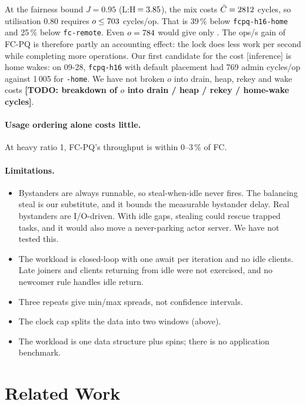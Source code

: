 \documentclass[10pt,twocolumn]{article}
\newcommand{\lk}[1]{\texttt{#1}}
\newcommand{\todo}[1]{{\color{red}\textbf{[TODO: #1]}}}
\begin{document}
At the fairness bound $J{=}0.95$ (L:H\,$=3.85$), the mix costs
$\bar C=2812$ cycles, so utilisation 0.80 requires
$o\le703$ cycles/op. That is 39\,\% below \lk{fcpq-h16-home} and
25\,\% below \lk{fc-remote}. Even $o=784$ would give only \UtilAtOFcOld. The
ops/s gain of FC-PQ is therefore partly an accounting effect: the lock does
less work per second while completing more operations. Our first candidate
for the cost [inference] is home wakes: on 09-28, \lk{fcpq-h16} with default
placement had 769 admin cycles/op against 1\,005 for \lk{-home}. We have not
broken $o$ into drain, heap, rekey and wake costs \todo{breakdown of $o$ into
drain / heap / rekey / home-wake cycles}.

\paragraph{Usage ordering alone costs little.} At heavy ratio 1, FC-PQ's
throughput is within 0--3\,\% of FC.

\paragraph{Limitations.}
\begin{itemize}
\item Bystanders are always runnable, so steal-when-idle never fires. The
  balancing steal is our substitute, and it bounds the measurable bystander
  delay. Real bystanders are I/O-driven. With idle gaps, stealing could
  rescue trapped tasks, and it would also move a never-parking actor server.
  We have not tested this.
\item The workload is closed-loop with one await per iteration and no idle
  clients. Late joiners and clients returning from idle were not exercised,
  and no newcomer rule handles idle return.
\item Three repeats give min/max spreads, not confidence intervals.
\item The clock cap splits the data into two windows (above).
\item The workload is one data structure plus spins; there is no application
  benchmark.
\end{itemize}

\section{Related Work}\label{sec:related}
\end{document}

